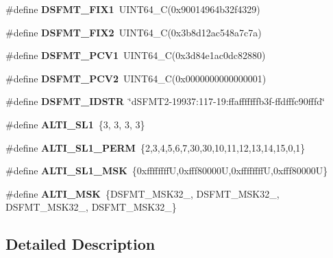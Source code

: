 \begin{DoxyCompactItemize}
\item 
\hypertarget{dSFMT-params19937_8h_a61a537cbb644335acc4fd1c8b19e46c9}{
\#define {\bfseries DSFMT\_\-FIX1}~UINT64\_\-C(0x90014964b32f4329)}
\label{dSFMT-params19937_8h_a61a537cbb644335acc4fd1c8b19e46c9}

\item 
\hypertarget{dSFMT-params19937_8h_af7ce5282a20037c76123e28224215d28}{
\#define {\bfseries DSFMT\_\-FIX2}~UINT64\_\-C(0x3b8d12ac548a7c7a)}
\label{dSFMT-params19937_8h_af7ce5282a20037c76123e28224215d28}

\item 
\hypertarget{dSFMT-params19937_8h_a736cb7f3b8a726e7a8af8de11b11f518}{
\#define {\bfseries DSFMT\_\-PCV1}~UINT64\_\-C(0x3d84e1ac0dc82880)}
\label{dSFMT-params19937_8h_a736cb7f3b8a726e7a8af8de11b11f518}

\item 
\hypertarget{dSFMT-params19937_8h_ad7f323200700dabb17f1aa4cc2fdecf7}{
\#define {\bfseries DSFMT\_\-PCV2}~UINT64\_\-C(0x0000000000000001)}
\label{dSFMT-params19937_8h_ad7f323200700dabb17f1aa4cc2fdecf7}

\item 
\hypertarget{dSFMT-params19937_8h_a342b1098354e02460cfd8110e404ecfc}{
\#define {\bfseries DSFMT\_\-IDSTR}~\char`\"{}dSFMT2-\/19937:117-\/19:ffafffffffb3f-\/ffdfffc90fffd\char`\"{}}
\label{dSFMT-params19937_8h_a342b1098354e02460cfd8110e404ecfc}

\item 
\hypertarget{dSFMT-params19937_8h_ac415e7b69de039fe68b8c6f7b78f6921}{
\#define {\bfseries ALTI\_\-SL1}~\{3, 3, 3, 3\}}
\label{dSFMT-params19937_8h_ac415e7b69de039fe68b8c6f7b78f6921}

\item 
\hypertarget{dSFMT-params19937_8h_a2b822df3b0a2b65fca8f3d2bee3df001}{
\#define {\bfseries ALTI\_\-SL1\_\-PERM}~\{2,3,4,5,6,7,30,30,10,11,12,13,14,15,0,1\}}
\label{dSFMT-params19937_8h_a2b822df3b0a2b65fca8f3d2bee3df001}

\item 
\hypertarget{dSFMT-params19937_8h_a105d2dcbffe59726b953dbbfc35bd05c}{
\#define {\bfseries ALTI\_\-SL1\_\-MSK}~\{0xffffffffU,0xfff80000U,0xffffffffU,0xfff80000U\}}
\label{dSFMT-params19937_8h_a105d2dcbffe59726b953dbbfc35bd05c}

\item 
\hypertarget{dSFMT-params19937_8h_a2d1e9cf9b55cad68fc271adeb29af1ad}{
\#define {\bfseries ALTI\_\-MSK}~\{DSFMT\_\-MSK32\_, DSFMT\_\-MSK32\_, DSFMT\_\-MSK32\_, DSFMT\_\-MSK32\_\}}
\label{dSFMT-params19937_8h_a2d1e9cf9b55cad68fc271adeb29af1ad}

\end{DoxyCompactItemize}


\subsection{Detailed Description}
